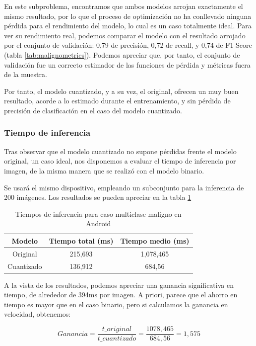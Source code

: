 En este subproblema, encontramos que ambos modelos arrojan exactamente el mismo resultado, por lo que el proceso de optimización no ha conllevado ninguna pérdida para el rendimiento del modelo, lo cual es un caso totalmente ideal. Para ver su rendimiento real, podemos comparar el modelo con el resultado arrojado por el conjunto de validación:  0,79 de precisión,  0,72 de recall, y  0,74 de F1 Score (tabla \ref{tab:malignometrics}).  Podemos apreciar que, por tanto, el conjunto de validación fue un correcto estimador de las funciones de pérdida y métricas fuera de la muestra.

Por tanto, el modelo cuantizado, y a su vez, el original, ofrecen un muy buen resultado, acorde a lo estimado durante el entrenamiento, y sin pérdida de precisión de clasificación en el caso del modelo cuantizado. 

\subsubsection{Tiempo de inferencia}

Tras observar que el modelo cuantizado no supone pérdidas frente el modelo original, un caso ideal, nos disponemos a evaluar el tiempo de inferencia por imagen, de la misma manera que se realizó con el modelo binario.

Se usará el mismo dispositivo, empleando un subconjunto para la inferencia de 200 imágenes. Los resultados se pueden apreciar en la tabla \ref{infmal}

\begin{table}[H]
	\centering
	\begin{tabular}{|c|c|c|}
		\hline
		Modelo & Tiempo total (ms) & Tiempo medio (ms) \\ \hline
		Original & 215,693 & 1,078,465	 \\ \hline
		Cuantizado & 136,912 & 684,56 \\ \hline
	\end{tabular}
	\caption{Tiempos de inferencia para caso multiclase maligno en Android}
	\label{infmal}
\end{table}

A la vista de los resultados, podemos apreciar una ganancia significativa en tiempo, de alrededor de 394ms por imagen. A priori, parece que el ahorro en tiempo es mayor que en el caso binario, pero si calculamos la ganancia en velocidad, obtenemos:

$$Ganancia = \frac{t\_original}{t\_cuantizado} = \frac{1078,465}{684,56} = 1,575$$

